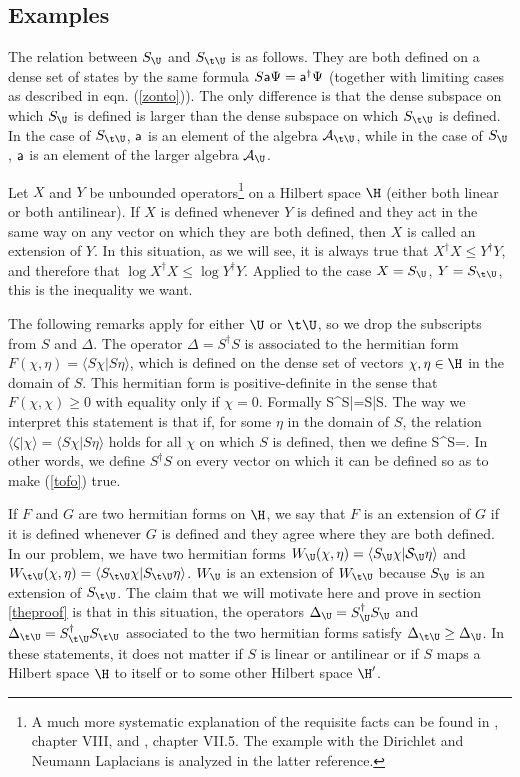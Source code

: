 \documentclass[12pt]{article}
\def\a{{\sf a}}
\def\ra{\rangle}
\def\la{\langle}
\def\S{{\mathcal S}}
\numberwithin{equation}{section}
\def\A{{\mathcal A}}
\begin{document}
  
\subsection{Examples}\label{practice}

The relation between $S_{\U}$ and $S_{\t\U}$ is as follows. They are both defined on a dense set of states by the same formula $S\a\Psi=\a^\dagger\Psi$ (together with limiting cases as described in eqn. (\ref{zonto})).
The only difference is that  the dense subspace on which $S_\U$ is defined is larger than the dense subspace on which $S_{\t\U}$ is defined.  In the case of 
$S_{\t\U}$, $\a$ is an element of the algebra $\A_{\t\U}$, while in the case of $S_\U$, $\a$ is an element of the larger algebra $\A_\U$.

Let $X$ and $Y$ be unbounded operators\footnote{A much more systematic explanation of the 
requisite facts
can be found in \cite{ReedSimon}, chapter VIII, and \cite{Simon}, chapter VII.5. The example with the Dirichlet and Neumann Laplacians
is analyzed in the latter reference.}  on a Hilbert space $\H$ (either both linear or both antilinear).   If $X$ is defined whenever $Y$ is defined and they act in the same way on any vector on which they are both
defined, then $X$ is called an extension of $Y$.  In this situation, as we will see, it is always true that $X^\dagger X\leq Y^\dagger Y$, and therefore that $\log X^\dagger X \leq \log Y^\dagger Y. $  Applied to the case $X=S_\U$,
$Y=S_{\t\U}$, this is the inequality we want.

The following remarks apply for either $\U$ or $\t\U$, so we drop the subscripts from $S$ and $\Delta$.  The operator $\Delta=S^\dagger S$ is associated to the hermitian form $F(\chi,\eta)=\la S\chi|S\eta\ra$, which
is defined on the dense set of vectors $\chi,\eta\in\H$ in the domain of $S$.   This hermitian form is positive-definite in the sense that $F(\chi,\chi)\geq 0$ with equality only if $\chi=0$.  Formally
\be\label{tofo} \la S^\dagger S\eta|\chi\ra=\la S\chi|S\eta\ra.\ee
The way we interpret  this statement is that if, for some $\eta$ in the domain of $S$, the relation
$\la\zeta|\chi\ra=\la S\chi|S\eta\ra$ holds for all $\chi$ on which $S$ is defined, then we define
\be\label{fogo} S^\dagger S\eta=\zeta. \ee
In other words, we define $S^\dagger S$ on every vector on which it can be defined so as to make (\ref{tofo}) true.

If $F$ and $G$ are two hermitian forms on $\H$, we say that $F$ is an extension of $G$ if it is defined whenever $G$ is defined and they agree where they are both defined.  In our problem, we have two
hermitian forms  $W_\U(\chi,\eta)=\la S_\U\chi|\S_\U\eta\ra$ and $W_{\t\U} (\chi,\eta)=\la S_{\t\U}\chi|S_{\t\U}\eta\ra$.  $W_\U$ is an extension of $W_{\t\U}$ because $S_\U$ is an extension of $S_{\t\U}$.
The claim that we will motivate here and prove in section \ref{theproof} is that in this situation, the operators $\Delta_\U=S^\dagger_\U S_\U$ and $\Delta_{\t\U}=S^\dagger_{\t\U}S_{\t\U}$ associated to the two
hermitian forms satisfy $\Delta_{\t\U}\geq \Delta_\U$.  In these statements, it does not matter if $S$ is linear or antilinear or if $S$ maps a Hilbert space $\H$ to itself or to some other Hilbert space $\H'$.
\end{document}
